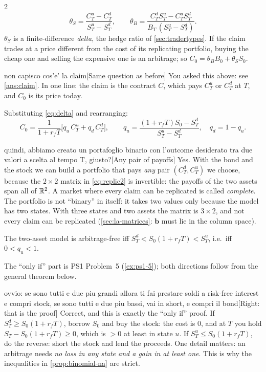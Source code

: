 \begin{paracol}{2}
\begin{equation}\label{eq:delta}
  \theta_S = \frac{C_T^u-C_T^d}{S_T^u-S_T^d},\qquad
  \theta_B = \frac{C_T^dS_T^u-C_T^uS_T^d}{B_T\,(S_T^u-S_T^d)} .
\end{equation}
$\theta_S$ is a finite-difference \emph{delta}, the hedge ratio of \cref{sec:tradertypes}. If the claim
trades at a price different from the cost of its replicating portfolio, buying the cheap one and
selling the expensive one is an arbitrage; so $C_0 = \theta_BB_0+\theta_SS_0$.\begin{answer}{non capisco cos'e' la claim}[Same question as before]
You asked this above: see \cref{ans:claim}. In one line: the claim is the contract $C$, which pays
$C_T^u$ or $C_T^d$ at $T$, and $C_0$ is its price today.
\end{answer} Substituting
\eqref{eq:delta} and rearranging:
\begin{equation}\label{eq:rnbinomial}
  C_0 = \frac{1}{1+r_fT}\bigl[q_u\,C_T^u + q_d\,C_T^d\bigr],\qquad
  q_u = \frac{(1+r_fT)S_0-S_T^d}{S_T^u-S_T^d},\quad q_d = 1-q_u .
\end{equation}\begin{answer}{quindi, abbiamo creato un portafoglio binario con l'outcome desiderato tra due valori a scelta al tempo T, giusto?}[Any pair of payoffs]\label{ans:anypair}
Yes. With the bond and the stock we can build a portfolio that pays \emph{any} pair $(C_T^d,C_T^u)$ we
choose, because the $2\times2$ matrix in \eqref{eq:replic2} is invertible: the payoffs of the two
assets span all of $\mathbb{R}^2$. A market where every claim can be replicated is called \emph{complete}.
The portfolio is not ``binary'' in itself: it takes two values only because the model has two states.
With three states and two assets the matrix is $3\times2$, and not every claim can be replicated
(\cref{sec:la-matrices}: $\bm b$ must lie in the column space).
\end{answer}



\begin{proposition}\label{prop:binomial-na}
The two-asset model is arbitrage-free iff $S_T^d < S_0(1+r_fT) < S_T^u$, i.e.\ iff $0<q_u<1$.
\end{proposition}
The ``only if'' part is PS1 Problem~5 (\cref{ex:ps1-5}); both directions follow from the general
theorem below.\begin{answer}{ovvio: se sono tutti e due piu grandi allora ti fai prestare soldi a risk-free interest e compri stock, se sono tutti e due piu bassi, vai in short, e compri il bond}[Right: that is the proof]
Correct, and this is exactly the ``only if'' proof. If $S_T^d\ge S_0(1+r_fT)$, borrow $S_0$ and buy the
stock: the cost is $0$, and at $T$ you hold $S_T-S_0(1+r_fT)\ge0$, which is $>0$ at least in state $u$.
If $S_T^u\le S_0(1+r_fT)$, do the reverse: short the stock and lend the proceeds. One detail matters:
an arbitrage needs \emph{no loss in any state and a gain in at least one}. This is why the
inequalities in \cref{prop:binomial-na} are strict.
\end{answer}


\end{paracol}
